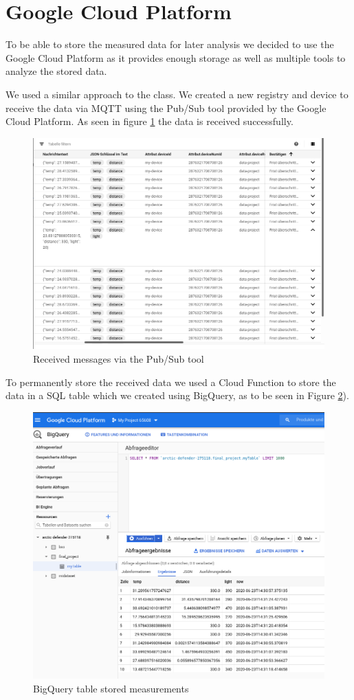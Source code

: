 \documentclass{article}
\begin{document}
\section{Google Cloud Platform}
To be able to store the measured data for later analysis we decided to use the Google Cloud Platform as it provides enough storage as well as multiple tools to analyze the stored data.\par
We used a similar approach to the class. We created a new registry and device to receive the data via MQTT using the Pub/Sub tool provided by the Google Cloud Platform. As seen in figure \ref{pic:messages} the data is received successfully.\par
\begin{figure}
\centering
\includegraphics[scale=0.4]{messages.png}
\caption{Received messages via the Pub/Sub tool}
\label{pic:messages}
\end{figure}
To permanently store the received data we used a Cloud Function to store the data in a SQL table which we created using BigQuery, as to be seen in Figure \ref{fig:table}).
\begin{figure}
\centering
\includegraphics[scale=0.4]{table.png}
\caption{BigQuery table stored measurements}
\label{fig:table}
\end{figure}
\end{document}
